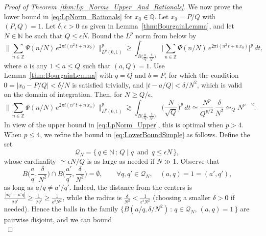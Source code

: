 \documentclass[11pt,reqno]{amsart}
\theoremstyle{definition}
\begin{document}
\begin{proof}[Proof of Theorem~\ref{thm:Lp_Norms_Upper_And_Rationals}]
We now prove the lower bound in \eqref{eq:LpNorm_Rationals} for $x_0 \in \mathbb Q$. 
Let $x_0 = P/Q$ with $(P,Q) = 1$. 
Let $\delta, \epsilon > 0$ as given in Lemma~\ref{thm:BourgainLemma}, 
and let $N \in \mathbb N$ be such that $Q \leq \epsilon N$. 
Bound the $L^p$ norm from below by 
\begin{equation}\label{eq:LowerBoundSimple}
 \Big\lVert  \sum_{n \in \mathbb Z} \Psi(n/N)\,  e^{2\pi i (n^2 \, t + n \, x_0)}  \Big\rVert_{L^p(0,1)}^p 
 \geq  \int_{B\big(  \frac{a}{Q}, \frac{\delta }{N^2} \big)}   \Big|  \sum_{n \in \mathbb Z} \Psi(n/N) \,  e^{2\pi i (n^2 \, t + n \, x_0)}  \Big|^p\, dt,
\end{equation}
where $a$ is any $1 \leq a \leq Q$ such that $(a,Q)=1$. 
Use Lemma~\ref{thm:BourgainLemma} with $q=Q$ and $b = P$, 
for which the condition $0 = |x_0 - P/Q| < \delta / N$ is satisfied trivially, 
and $|t - a/Q| < \delta / N^2$, which is valid on the domain of integration.
Then, for $N \geq Q / \epsilon$, 
\begin{equation}
 \Big\lVert  \sum_{n \in \mathbb Z} \Psi(n/N) \,  e^{2\pi i (n^2 \, t + n \, x_0)}  \Big\rVert_{L^p(0,1)}^p  
 \gtrsim \int_{B\big(  \frac{a}{Q}, \frac{\delta }{N^2} \big)} \Big( \frac{N}{\sqrt{Q}} \Big)^p\, dt 
 \simeq \frac{N^p}{Q^{p/2}} \, \frac{\delta}{N^2} \simeq_Q N^{p-2}. 
\end{equation} 
In view of the upper bound in \eqref{eq:LpNorm_Upper}, this is optimal when $p > 4$. 
When $p \leq 4$, we refine the bound in \eqref{eq:LowerBoundSimple} as follows. 
Define the set
\begin{equation}
\mathcal Q_N = \{  \, q \in \mathbb N \, : \,  Q \mid q \, \text{ and } \, q \leq \epsilon N \,  \}, 
\end{equation}
whose cardinality $ \simeq \epsilon N /Q$ is as large as needed if $N \gg 1$. 
Observe that 
\begin{equation}
B\Big( \frac{a}{q}, \frac{\delta}{N^2} \Big)  \cap  B\Big( \frac{a'}{q'}, \frac{\delta}{N^2} \Big) =  \emptyset , \qquad \forall q,q' \in \mathcal Q_N , \quad (a,q) = 1 = (a',q'), 
\end{equation}
as long as $a/q \neq a'/q'$. 
Indeed, the distance from the centers is $\frac{|aq' - a'q|}{q \, q'} \geq \frac{1}{q \, q'} \geq \frac{1}{\epsilon^2 N^2}$, 
while the radius is $\frac{\delta}{N^2} < \frac{1}{\epsilon^2 N^2}$ (choosing a smaller $\delta > 0$ if needed). 
Hence the balls in the family  $\{  B(a/q, \delta/N^2)  \, : \, q \in \mathcal Q_N, \, (a,q)=1 \, \} $ are pairwise disjoint, 
and we can bound 
\begin{equation}\label{eq:Case_P_Small}

\end{equation}
\end{proof}
\end{document}
